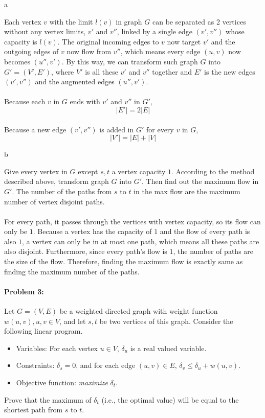 \documentclass{article}
\begin{document}
a

Each vertex $v$ with the limit $l(v)$ in graph $G$ can be separated as 2 vertices without any vertex limits, $v'$ and $v''$, linked by a single edge $(v', v'')$ whose capacity is $l(v)$. The original incoming edges to $v$ now target $v'$ and the outgoing edges of $v$ now flow from $v''$, which means every edge $(u, v)$ now becomes $(u'', v')$. By this way, we can transform such graph $G$ into $G' = (V', E')$, where $V'$ is all these $v'$ and $v''$ together and $E'$ is the new edges $(v', v'')$ and the augmented edges $(u'', v')$.

\paragraph{}
Because each $v$ in $G$ ends with $v'$ and $v''$ in $G'$,
$$|E'| = 2|E|$$
\paragraph{}
Because a new edge $(v', v'')$ is added in $G'$ for every $v$ in $G$,
$$|V'| = |E| + |V|$$

b

Give every vertex in $G$ except ${s, t}$ a vertex capacity $1$. According to the method described above, transform graph $G$ into $G'$. Then find out the maximum flow in $G'$. The number of the paths from $s$ to $t$ in the max flow are the maximum number of vertex disjoint paths.

\paragraph{}

For every path, it passes through the vertices with vertex capacity, so its flow can only be $1$. Because a vertex has the capacity of $1$ and the flow of every path is also $1$, a vertex can only be in at most one path, which means all these paths are also disjoint. Furthermore, since every path's flow is $1$, the number of paths are the size of the flow. Therefore, finding the maximum flow is exactly same as finding the maximum number of the paths.

\newpage
\paragraph{Problem 3:}
Let $G=(V,E)$ be a weighted directed graph with weight function $w(u,v), u,v \in V$, and let $s,t$ be two vertices of this graph. Consider the following linear program.
\begin{itemize}
    \item Variables: For each vertex $u \in V$, $\delta_u$ is a real valued variable.
    \item Constraints: $\delta_s=0$, and for each edge $(u,v) \in E$, $\delta_v \leq \delta_u + w(u,v)$.
    \item Objective function: \emph{maximize} $\delta_t$.
\end{itemize}
Prove that the maximum of $\delta_t$ (i.e., the optimal value) will be equal to the shortest path from $s$ to $t.$
\end{document}
